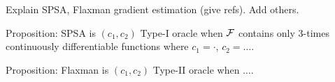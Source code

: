 
Explain SPSA, Flaxman gradient estimation (give refs).
Add others.

Proposition: SPSA is $(c_1,c_2)$ Type-I oracle when $\mathcal{F}$ contains only $3$-times continuously differentiable functions where  $c_1 = \cdot$, $c_2 = \dots$. 

Proposition:  Flaxman is $(c_1,c_2)$ Type-II oracle when $\dots$. 



